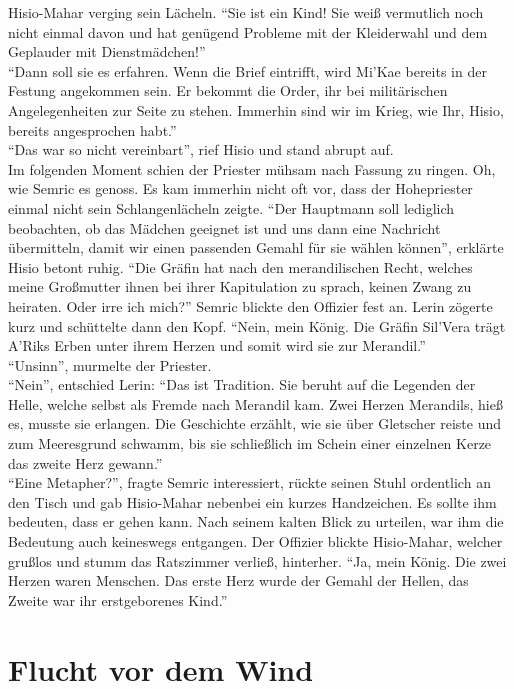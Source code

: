 Hisio-Mahar verging sein Lächeln. ``Sie ist ein Kind! Sie weiß vermutlich noch nicht einmal davon 
und hat genügend Probleme mit der Kleiderwahl und dem Geplauder mit Dienstmädchen!''\\
``Dann soll sie es erfahren. Wenn die Brief eintrifft, wird Mi'Kae bereits in der Festung 
angekommen sein. Er bekommt die Order, ihr bei militärischen Angelegenheiten zur Seite zu stehen. 
Immerhin sind wir im Krieg, wie Ihr, Hisio, bereits angesprochen habt.''\\
``Das war so nicht vereinbart'', rief Hisio und stand abrupt auf.\\
Im folgenden Moment schien der Priester mühsam nach Fassung zu ringen. Oh, wie Semric es genoss. Es 
kam immerhin nicht oft vor, dass der Hohepriester einmal nicht sein Schlangenlächeln zeigte.
``Der Hauptmann soll lediglich beobachten, ob das Mädchen geeignet ist und uns dann eine Nachricht 
übermitteln, damit wir einen passenden Gemahl für sie wählen können'', erklärte Hisio betont ruhig.
``Die Gräfin hat nach den merandilischen Recht, welches meine Großmutter ihnen bei ihrer 
Kapitulation zu sprach, keinen Zwang zu heiraten. Oder irre ich mich?'' Semric blickte den Offizier 
fest an.
Lerin zögerte kurz und schüttelte dann den Kopf. ``Nein, mein König. Die Gräfin Sil'Vera trägt 
A'Riks Erben unter ihrem Herzen und somit wird sie zur Merandil.''\\
``Unsinn'', murmelte der Priester.\\
``Nein'', entschied Lerin: ``Das ist Tradition. Sie beruht auf die Legenden der Helle, welche 
selbst als Fremde nach Merandil kam. Zwei Herzen Merandils, hieß es, musste sie erlangen. Die 
Geschichte erzählt, wie sie über Gletscher reiste und zum Meeresgrund schwamm, bis sie schließlich 
im Schein einer einzelnen Kerze das zweite Herz gewann.''\\
``Eine Metapher?'', fragte Semric interessiert, rückte seinen Stuhl ordentlich an den Tisch und gab 
Hisio-Mahar nebenbei ein kurzes Handzeichen. Es sollte ihm bedeuten, dass er gehen kann. Nach 
seinem kalten Blick zu urteilen, war ihm die Bedeutung auch keineswegs entgangen. Der Offizier 
blickte Hisio-Mahar, welcher grußlos und stumm das Ratszimmer verließ, hinterher. ``Ja, mein König. 
Die zwei Herzen waren Menschen. Das erste Herz wurde der Gemahl der Hellen, das Zweite war ihr 
erstgeborenes 
Kind.''\\


\chapter{Flucht vor dem Wind}

